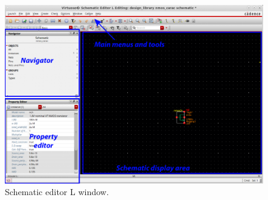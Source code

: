 \begin{enumerate}
	\begin{figure}[!h]
		\centering
		\includegraphics[scale=0.32]{figures/lab1_schematic_sim/schematicL.pdf}
		\caption{Schematic editor L window.}
		\label{fig_schematicL}
	\end{figure}
	

\end{enumerate}
